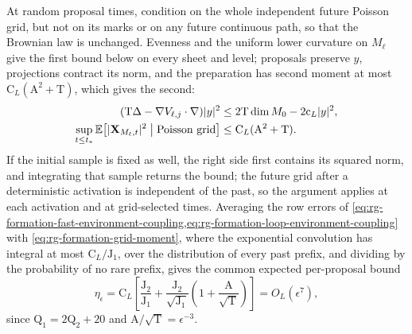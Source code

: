 At random proposal times, condition on the whole independent future Poisson
grid, but not on its marks or on any
future continuous path, so that the Brownian law is unchanged. Evenness and
the uniform lower curvature on \(M_\ell\) give the first bound below on every
sheet and level; proposals preserve \(y\), projections contract its norm, and
the preparation has second moment at most \(\mathrm C_L(\mathrm A^2+\mathrm T)\),
which gives the second:
\begin{align}
 (\mathrm T\Delta-\nabla V_{\ell,j}\cdot\nabla)|y|^2
 &\le2\mathrm T\dim M_0-2\mathrm c_L|y|^2,
 \label{eq:rg-formation-grid-moment-generator}\\
 \sup_{t\le t_*}\mathbb E\bigl[|\mathbf X_{M_\ell,t}|^2\bigm|\text{Poisson grid}\bigr]
 &\le \mathrm C_L(\mathrm A^2+\mathrm T).
 \label{eq:rg-formation-grid-moment}
\end{align}
If the initial sample is fixed as well, the right side first contains its
squared norm, and integrating that sample returns the bound; the future grid
after a deterministic activation is independent of the past, so the argument
applies at each activation and at grid-selected times. Averaging the row
errors of
\cref{eq:rg-formation-fast-environment-coupling,eq:rg-formation-loop-environment-coupling}
with \cref{eq:rg-formation-grid-moment}, where the exponential convolution has
integral at most \(\mathrm C_L/\mathrm J_1\), over the distribution of every
past prefix, and dividing by the probability of no rare prefix, gives the
common expected per-proposal bound
\begin{equation}
 \eta_\epsilon
 =\mathrm C_L\left[\frac{\mathrm J_2}{\mathrm J_1}
       +\frac{\mathrm J_2}{\sqrt{\mathrm J_1}}
                       \left(1+\frac{\mathrm A}{\sqrt{\mathrm T}}\right)\right]
 =O_L(\epsilon^7),
 \label{eq:rg-formation-averaged-environment-error}
\end{equation}
since \(\mathrm Q_1=2\mathrm Q_2+20\) and \(\mathrm A/\sqrt{\mathrm T}=\epsilon^{-3}\).

